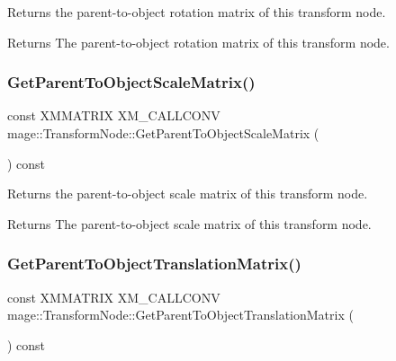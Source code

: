 Returns the parent-\/to-\/object rotation matrix of this transform node.

\begin{DoxyReturn}{Returns}
The parent-\/to-\/object rotation matrix of this transform node. 
\end{DoxyReturn}
\hypertarget{classmage_1_1_transform_node_a0cb65b5df44027b483ee82139c102382}{}\label{classmage_1_1_transform_node_a0cb65b5df44027b483ee82139c102382} 
\subsubsection{\texorpdfstring{Get\+Parent\+To\+Object\+Scale\+Matrix()}{GetParentToObjectScaleMatrix()}}
{\footnotesize\ttfamily const X\+M\+M\+A\+T\+R\+IX X\+M\+\_\+\+C\+A\+L\+L\+C\+O\+NV mage\+::\+Transform\+Node\+::\+Get\+Parent\+To\+Object\+Scale\+Matrix (\begin{DoxyParamCaption}{ }\end{DoxyParamCaption}) const\hspace{0.3cm}{\ttfamily [noexcept]}}

Returns the parent-\/to-\/object scale matrix of this transform node.

\begin{DoxyReturn}{Returns}
The parent-\/to-\/object scale matrix of this transform node. 
\end{DoxyReturn}
\hypertarget{classmage_1_1_transform_node_ae88b4133e4920cb87b8ce32fe083bf17}{}\label{classmage_1_1_transform_node_ae88b4133e4920cb87b8ce32fe083bf17} 
\subsubsection{\texorpdfstring{Get\+Parent\+To\+Object\+Translation\+Matrix()}{GetParentToObjectTranslationMatrix()}}
{\footnotesize\ttfamily const X\+M\+M\+A\+T\+R\+IX X\+M\+\_\+\+C\+A\+L\+L\+C\+O\+NV mage\+::\+Transform\+Node\+::\+Get\+Parent\+To\+Object\+Translation\+Matrix (\begin{DoxyParamCaption}{ }\end{DoxyParamCaption}) const\hspace{0.3cm}{\ttfamily [noexcept]}}

